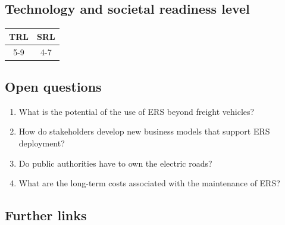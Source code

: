 \documentclass[
]{book}
\providecommand{\tightlist}{%
  \setlength{\itemsep}{0pt}\setlength{\parskip}{0pt}}
\begin{document}
\hypertarget{technology-and-societal-readiness-level-2}{%
\subsection*{Technology and societal readiness level}\label{technology-and-societal-readiness-level-2}}

\begin{longtable}[]{@{}cc@{}}
\toprule
TRL & SRL\tabularnewline
\midrule
\endhead
5-9 & 4-7\tabularnewline
\bottomrule
\end{longtable}

\hypertarget{open-questions-2}{%
\subsection*{Open questions}\label{open-questions-2}}

\begin{enumerate}
\def\labelenumi{\arabic{enumi}.}
\tightlist
\item
  What is the potential of the use of ERS beyond freight vehicles?
\item
  How do stakeholders develop new business models that support ERS deployment?
\item
  Do public authorities have to own the electric roads?
\item
  What are the long-term costs associated with the maintenance of ERS?
\end{enumerate}

\hypertarget{further-links-2}{%
\subsection*{Further links}\label{further-links-2}}
\end{document}
